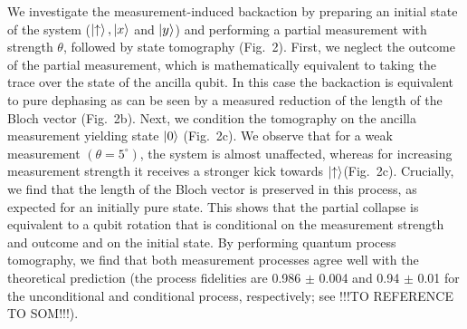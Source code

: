 We investigate the measurement-induced backaction by preparing an initial state of the system ($\left|\uparrow\right\rangle,\left|x\right\rangle$ and $\left|y\right\rangle$) and performing a partial measurement with strength $\theta$, followed by state tomography (Fig.~2). First, we neglect the outcome of the partial measurement, which is mathematically equivalent to taking the trace over the state of the ancilla qubit. In this case the backaction is equivalent to pure dephasing as can be seen by a measured reduction of the length of the Bloch vector (Fig.~2b). Next, we condition the tomography on the ancilla measurement yielding state $\left|0\right\rangle$ (Fig.~2c). We observe that for a weak measurement $(\theta = 5^{\circ})$, the system is almost unaffected, whereas for increasing measurement strength it receives a stronger kick towards $\left|\uparrow\right\rangle $(Fig.~2c). Crucially, we find that the length of the Bloch vector is preserved in this process, as expected for an initially pure state. This shows that the partial collapse is equivalent to a qubit rotation that is conditional on the measurement strength and outcome and on the initial state. By performing quantum process tomography, we find that both measurement processes agree well with the theoretical prediction (the process fidelities are 0.986 $\pm$ 0.004 and 0.94 $\pm$ 0.01 for the unconditional and conditional process, respectively; see !!!TO REFERENCE TO SOM!!!).


